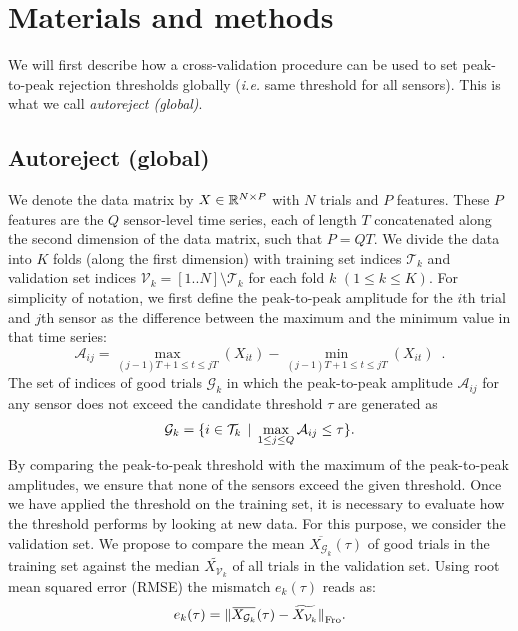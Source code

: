 \section{Materials and methods}
%
We will first describe how a cross-validation procedure can be used to set peak-to-peak rejection thresholds globally (\textit{i.e.} same threshold for all sensors). This is what we call \textit{autoreject (global)}.

\subsection{Autoreject (global)}
\label{sec:auto_global}
We denote the data matrix by $X \in \mathbb{R}^{N \times P}$ with $N$ trials and $P$ features. These $P$ features are the $Q$ sensor-level time series, each of length $T$ concatenated along the second dimension of the data matrix, such that $P=QT$. We divide the data into $K$ folds (along the first dimension) with training set indices $\mathcal{T}_{k}$ and validation set indices $\mathcal{V}_{k}=[1..N] \setminus {\mathcal{T}_k}$ for each fold $k$ $(1 \leq k \leq K)$. For simplicity of notation, we first define the peak-to-peak amplitude for the $i$th trial and $j$th sensor as the difference between the maximum and the minimum value in that time series:
\begin{equation}
\mathcal{A}_{ij} = \max_{(j-1)T+1 \leq t \leq jT} (X_{it}) - \min_{(j-1)T+1 \leq t \leq jT} (X_{it}) \enspace .
\end{equation}
The set of indices of good trials $\mathcal{G}_k$ in which the peak-to-peak amplitude $\mathcal{A}_{ij}$ for any sensor does not exceed the candidate threshold $\tau$ are generated as
\begin{equation}
\mathcal{G}_k = \{i \in \mathcal{T}_{k} \, \mid \, \max_{1 \leq j \leq Q} \mathcal{A}_{ij} \leq \tau\}.
\end{equation}
By comparing the peak-to-peak threshold with the maximum of the peak-to-peak amplitudes, we ensure that none of the sensors exceed the given threshold. Once we have applied the threshold on the training set, it is necessary to evaluate how the threshold performs by looking at new data. For this purpose, we consider the validation set. We propose to compare the mean $\overbar{X_{\mathcal{G}_k}}(\tau)$ of good trials in the training set against the median $\widetilde{X_{\mathcal{V}_k}}$ of all trials in the validation set. Using root mean squared error (RMSE) the mismatch $e_{k}(\tau)$ reads as:
\begin{equation}
 e_{k}(\tau) = \fro{\overbar{X_{\mathcal{G}_k}}(\tau) - \widetilde{X_{\mathcal{V}_k}}}.
\label{eq:err} 
\end{equation}
